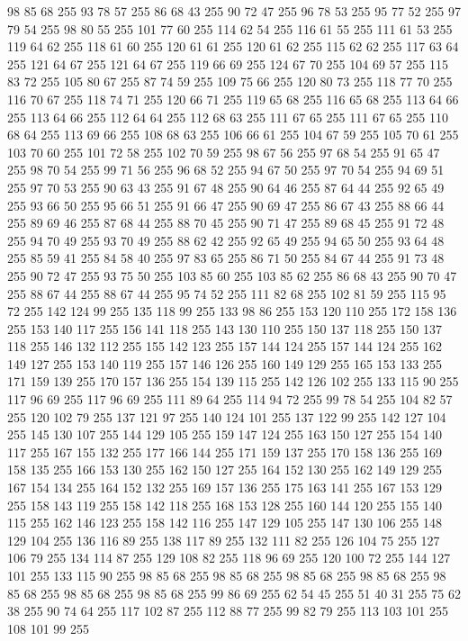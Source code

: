 98 85 68 255 93 78 57 255 86 68 43 255 90 72 47 255 96 78 53 255 95 77 52 255 97 79 54 255 98 80 55 255 101 77 60 255 114 62 54 255 116 61 55 255 111 61 53 255 119 64 62 255 118 61 60 255 120 61 61 255 120 61 62 255 115 62 62 255 117 63 64 255 121 64 67 255 121 64 67 255 119 66 69 255 124 67 70 255 104 69 57 255 115 83 72 255 105 80 67 255 87 74 59 255 109 75 66 255 120 80 73 255 118 77 70 255 116 70 67 255 118 74 71 255 120 66 71 255 119 65 68 255 116 65 68 255 113 64 66 255 113 64 66 255 112 64 64 255 112 68 63 255 111 67 65 255 111 67 65 255 110 68 64 255 113 69 66 255 108 68 63 255 106 66 61 255 104 67 59 255 105 70 61 255 103 70 60 255 101 72 58 255 102 70 59 255 98 67 56 255 97 68 54 255 91 65 47 255 98 70 54 255 99 71 56 255 96 68 52 255 94 67 50 255 97 70 54 255 94 69 51 255 97 70 53 255 90 63 43 255 91 67 48 255 90 64 46 255 87 64 44 255 92 65 49 255
93 66 50 255 95 66 51 255 91 66 47 255 90 69 47 255 86 67 43 255 88 66 44 255 89 69 46 255 87 68 44 255 88 70 45 255 90 71 47 255 89 68 45 255 91 72 48 255 94 70 49 255 93 70 49 255 88 62 42 255 92 65 49 255 94 65 50 255 93 64 48 255 85 59 41 255 84 58 40 255 97 83 65 255 86 71 50 255 84 67 44 255 91 73 48 255 90 72 47 255 93 75 50 255 103 85 60 255 103 85 62 255 86 68 43 255 90 70 47 255 88 67 44 255 88 67 44 255 95 74 52 255 111 82 68 255 102 81 59 255 115 95 72 255 142 124 99 255 135 118 99 255 133 98 86 255 153 120 110 255 172 158 136 255 153 140 117 255 156 141 118 255 143 130 110 255 150 137 118 255 150 137 118 255 146 132 112 255 155 142 123 255 157 144 124 255 157 144 124 255 162 149 127 255 153 140 119 255 157 146 126 255 160 149 129 255 165 153 133 255 171 159 139 255 170 157 136 255 154 139 115 255 142 126 102 255 133 115 90 255 117 96 69 255 117 96 69 255 111 89 64 255 114 94 72 255
99 78 54 255 104 82 57 255 120 102 79 255 137 121 97 255 140 124 101 255 137 122 99 255 142 127 104 255 145 130 107 255 144 129 105 255 159 147 124 255 163 150 127 255 154 140 117 255 167 155 132 255 177 166 144 255 171 159 137 255 170 158 136 255 169 158 135 255 166 153 130 255 162 150 127 255 164 152 130 255 162 149 129 255 167 154 134 255 164 152 132 255 169 157 136 255 175 163 141 255 167 153 129 255 158 143 119 255 158 142 118 255 168 153 128 255 160 144 120 255 155 140 115 255 162 146 123 255 158 142 116 255 147 129 105 255 147 130 106 255 148 129 104 255 136 116 89 255 138 117 89 255 132 111 82 255 126 104 75 255 127 106 79 255 134 114 87 255 129 108 82 255 118 96 69 255 120 100 72 255 144 127 101 255 133 115 90 255 98 85 68 255 98 85 68 255 98 85 68 255 98 85 68 255 98 85 68 255 98 85 68 255 98 85 68 255 99 86 69 255 62 54 45 255 51 40 31 255 75 62 38 255 90 74 64 255 117 102 87 255 112 88 77 255 99 82 79 255 113 103 101 255 108 101 99 255
